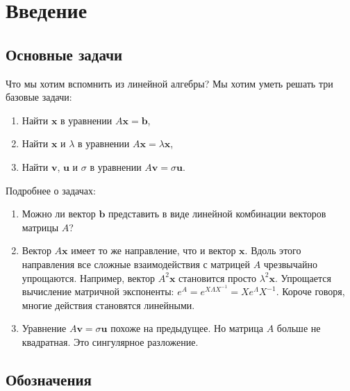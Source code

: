 \documentclass[11pt,a4paper]{article}
\begin{document}
\hypertarget{ux432ux432ux435ux434ux435ux43dux438ux435}{%
\section{Введение}\label{ux432ux432ux435ux434ux435ux43dux438ux435}}

\hypertarget{ux43eux441ux43dux43eux432ux43dux44bux435-ux437ux430ux434ux430ux447ux438}{%
\subsection{Основные
задачи}\label{ux43eux441ux43dux43eux432ux43dux44bux435-ux437ux430ux434ux430ux447ux438}}

Что мы хотим вспомнить из линейной алгебры? Мы хотим уметь решать три базовые задачи:

\begin{enumerate}
\def\labelenumi{\arabic{enumi}.}
\item
  Найти \(\mathbf{x}\) в уравнении \(A\mathbf{x} = \mathbf{b}\),
\item
  Найти \(\mathbf{x}\) и \(\lambda\) в уравнении
  \(A\mathbf{x} = \lambda \mathbf{x}\),
\item
  Найти \(\mathbf{v}\), \(\mathbf{u}\) и \(\sigma\) в уравнении
  \(A\mathbf{v} = \sigma \mathbf{u}\).
\end{enumerate}

Подробнее о задачах:
\begin{enumerate}
\item
  Можно ли вектор \(\mathbf{b}\) представить в виде линейной комбинации
  векторов матрицы \(A\)?
\item
  Вектор \(A\mathbf{x}\) имеет то же направление, что и вектор
  \(\mathbf{x}\). Вдоль этого направления все сложные взаимодействия с
  матрицей \(A\) чрезвычайно упрощаются. Например, вектор
  \(A^2 \mathbf{x}\) становится просто \(\lambda^2 \mathbf{x}\).
  Упрощается вычисление матричной экспоненты:
  \(e^{A} = e^{X \Lambda X^{-1}} = X e^{\Lambda} X^{-1}\). Короче
  говоря, многие действия становятся линейными.
\item
  Уравнение \(A\mathbf{v} = \sigma \mathbf{u}\) похоже на предыдущее. Но
  матрица \(A\) больше не квадратная. Это сингулярное разложение.
\end{enumerate}

    \hypertarget{ux43eux431ux43eux437ux43dux430ux447ux435ux43dux438ux44f}{%
\subsection{Обозначения}\label{ux43eux431ux43eux437ux43dux430ux447ux435ux43dux438ux44f}}
\end{document}
